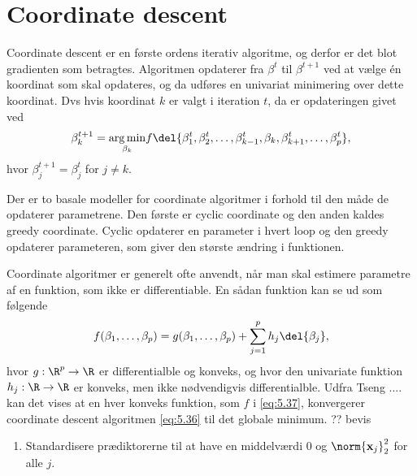 \section{Coordinate descent}
Coordinate descent er en første ordens iterativ algoritme, og derfor er det blot gradienten som betragtes.
Algoritmen opdaterer fra \(\beta^t\) til \(\beta^{t+1}\) ved at vælge én koordinat som skal opdateres, og da udføres en univariat minimering over dette koordinat.
Dvs hvis koordinat $k$ er valgt i iteration $t$, da er opdateringen givet ved
\begin{align}
\beta_k^{t+1} =\underset{ \beta_k}{\arg \min}  f\del{ \beta_1^t, \beta_2^t, \dots, \beta_{k-1}^t, \beta_k, \beta_{k+1}^t, \dots, \beta_p^t  }, \label{eq:5.36}
\end{align}
hvor $\beta_j^{t+1} = \beta_j^t$ for $j \neq k$. 

Der er to basale modeller for coordinate algoritmer i forhold til den måde de opdaterer parametrene. Den første er cyclic coordinate og den anden kaldes greedy coordinate. 
Cyclic opdaterer en parameter i hvert loop og den greedy opdaterer parameteren, som giver den største ændring i funktionen. 

Coordinate algoritmer er generelt ofte anvendt, når man skal estimere parametre af en funktion, som ikke er differentiable. 
En sådan funktion kan se ud som følgende
\begin{align}
f(\beta_1, \dots, \beta_p) = g(\beta_1, \dots, \beta_p) + \sum_{j = 1}^p h_j \del{\beta_j}, \label{eq:5.37}
\end{align}
hvor $g: \R^p \rightarrow \R $ er differentialble og konveks, og hvor den univariate funktion $h_j : \R \rightarrow \R$ er konveks, men ikke nødvendigvis differentialble. Udfra Tseng .... kan det vises at en hver konveks funktion, som $f$ i \eqref{eq:5.37}, konvergerer coordinate descent algoritmen \eqref{eq:5.36} til det globale minimum. 
?? bevis
 
 
\begin{alg} 
\begin{enumerate}
%
\item Standardisere prædiktorerne til at have en middelværdi 0 og $\norm{\textbf{x}_j}_2^2$ for alle $j$.
\end{enumerate}
\end{alg}
